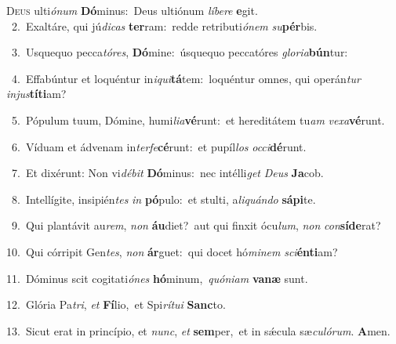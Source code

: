 \lettrine{\initial\textcolor{\initialcolor}{D}}{eus} ulti\-\textit{ó}\-\textit{num} \textbf{Dó}\-minus:~\star Deus ultiónum \textit{lí}\-\textit{be}\textit{re} \textbf{e}\-git.\\
{\numbfont\textcolor{\numbcolor}{~2.}}~Exaltáre, qui jú\-\textit{di}\-\textit{cas} \textbf{ter}\-ram:~\star redde retributi\-\textit{ó}\-\textit{nem} \textit{su}\-\textbf{pér}bis.\par
{\numbfont\textcolor{\numbcolor}{~3.}}~Usquequo pecca\-\textit{tó}\-\textit{res}, \textbf{Dó}\-mine:~\star úsquequo peccatóres \textit{glo}\-\textit{ri}\textit{a}\textbf{bún}tur:\par
{\numbfont\textcolor{\numbcolor}{~4.}}~Effabúntur et loquéntur in\-\textit{i}\-\textit{qui}\textbf{tá}tem:~\star loquéntur omnes, qui operán\textit{tur} \textit{in}\-\textit{jus}\textbf{tí}\textbf{ti}am?\par
{\numbfont\textcolor{\numbcolor}{~5.}}~Pópulum tuum, Dómine, humi\-\textit{li}\-\textit{a}\textbf{vé}runt:~\star et hereditátem tu\textit{am} \textit{ve}\-\textit{xa}\textbf{vé}runt.\par
{\numbfont\textcolor{\numbcolor}{~6.}}~Víduam et ádvenam in\-\textit{ter}\-\textit{fe}\textbf{cé}runt:~\star et pupíl\textit{los} \textit{oc}\-\textit{ci}\textbf{dé}runt.\par
{\numbfont\textcolor{\numbcolor}{~7.}}~Et dixérunt: Non vi\-\textit{dé}\-\textit{bit} \textbf{Dó}\-minus:~\star nec intélli\textit{get} \textit{De}\-\textit{us} \textbf{Ja}\-cob.\par
{\numbfont\textcolor{\numbcolor}{~8.}}~Intellígite, insipién\textit{tes} \textit{in} \textbf{pó}\-pulo:~\star et stulti, a\-\textit{li}\-\textit{quán}\textit{do} \textbf{sá}\-\textbf{pi}te.\par
{\numbfont\textcolor{\numbcolor}{~9.}}~Qui plantávit au\-\textit{rem}\-, \textit{non} \textbf{áu}\-diet?~\star aut qui finxit ócu\-\textit{lum}\-, \textit{non} \textit{con}\-\textbf{sí}\textbf{de}rat?\par
{\numbfont\textcolor{\numbcolor}{10.}}~Qui córripit Gen\-\textit{tes}\-, \textit{non} \textbf{ár}\-guet:~\star qui docet hó\-\textit{mi}\-\textit{nem} \textit{sci}\-\textbf{én}\textbf{ti}am?\par
{\numbfont\textcolor{\numbcolor}{11.}}~Dóminus scit cogitati\-\textit{ó}\-\textit{nes} \textbf{hó}\-minum,~\star \textit{quón}\-\textit{i}\textit{am} \textbf{va}\-\textbf{næ} sunt.\par
{\numbfont\textcolor{\numbcolor}{12.}}~Glória Pa\-\textit{tri}\-, \textit{et} \textbf{Fí}\-lio,~\star et Spi\-\textit{rí}\-\textit{tu}\textit{i} \textbf{Sanc}\-to.\par
{\numbfont\textcolor{\numbcolor}{13.}}~Sicut erat in princípio, et \textit{nunc}\-, \textit{et} \textbf{sem}\-per,~\star et in sǽcula sæ\-\textit{cu}\-\textit{ló}\textit{rum}. \textbf{A}\-men.\par
